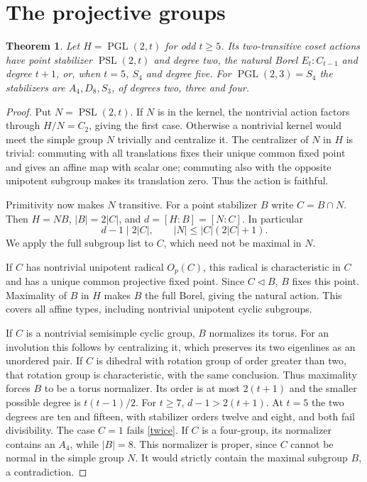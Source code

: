 \documentclass[11pt]{article}
\newtheorem{theorem}{Theorem}
\newcommand{\PSL}{\operatorname{PSL}}
\newcommand{\PGL}{\operatorname{PGL}}
\begin{document}
\section{The projective groups}
\begin{theorem}\label{projective}
Let $H=\PGL(2,t)$ for odd $t\geq5$. Its two-transitive
coset actions have point stabilizer $\PSL(2,t)$ and degree two,
the natural Borel $E_t:C_{t-1}$ and degree $t+1$, or, when
$t=5$, $S_4$ and degree five. For $\PGL(2,3)=S_4$ the
stabilizers are $A_4,D_8,S_3$, of degrees two, three and four.
\end{theorem}
\begin{proof}
Put $N=\PSL(2,t)$. If $N$ is in the kernel, the nontrivial
action factors through $H/N=C_2$, giving the first case.
Otherwise a nontrivial kernel would meet the simple group $N$
trivially and centralize it. The centralizer of $N$ in $H$ is
trivial: commuting with all translations fixes their unique common
fixed point and gives an affine map with scalar one; commuting
also with the opposite unipotent subgroup makes its translation
zero. Thus the action is faithful.

Primitivity now makes $N$ transitive. For a point stabilizer $B$
write $C=B\cap N$. Then $H=NB$, $|B|=2|C|$, and
$d=[H:B]=[N:C]$. In particular
\begin{equation}\label{twice}
 d-1\mid 2|C|,\qquad |N|\leq |C|(2|C|+1).
\end{equation}
We apply the full subgroup list to $C$, which need not be maximal
in $N$.

If $C$ has nontrivial unipotent radical $O_p(C)$, this radical
is characteristic in $C$ and has a unique common projective fixed
point. Since $C\lhd B$, $B$ fixes this point. Maximality of $B$
in $H$ makes $B$ the full Borel, giving the natural action.
This covers all affine types, including nontrivial unipotent
cyclic subgroups.

If $C$ is a nontrivial semisimple cyclic group, $B$ normalizes its
torus. For an involution this follows by centralizing it, which
preserves its two eigenlines as an unordered pair. If $C$ is
dihedral with rotation group of order greater than two, that
rotation group is characteristic, with the same conclusion.
Thus maximality forces $B$ to be a torus normalizer. Its order
is at most $2(t+1)$ and the smaller possible degree is
$t(t-1)/2$. For $t\geq7$, $d-1>2(t+1)$. At $t=5$ the
two degrees are ten and fifteen, with stabilizer orders twelve
and eight, and both fail divisibility. The case $C=1$ fails
\eqref{twice}. If $C$ is a four-group, its normalizer contains
an $A_4$, while $|B|=8$. This normalizer is proper, since
$C$ cannot be normal in the simple group $N$. It would strictly
contain the maximal subgroup $B$, a contradiction.


\end{proof}
\end{document}
